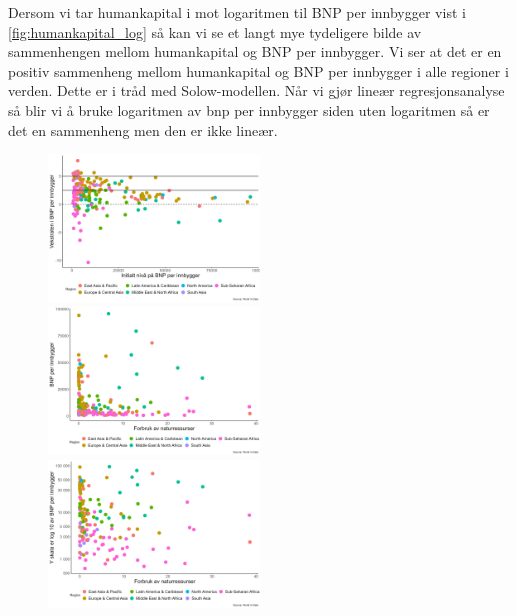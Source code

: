 \documentclass[
  12pt,
  a4paper,
  DIV=11,
  numbers=noendperiod]{scrartcl}
\begin{document}
Dersom vi tar humankapital i mot logaritmen til BNP per innbygger vist i
\autoref{fig:humankapital_log} så kan vi se et langt mye tydeligere
bilde av sammenhengen mellom humankapital og BNP per innbygger. Vi ser
at det er en positiv sammenheng mellom humankapital og BNP per innbygger
i alle regioner i verden. Dette er i tråd med Solow-modellen. Når vi
gjør lineær regresjonsanalyse så blir vi å bruke logaritmen av bnp per
innbygger siden uten logaritmen så er det en sammenheng men den er ikke
lineær.

\clearpage

\begin{figure}
  \centering
  \includegraphics[width=0.5\textwidth]{dokumentobjekter/figurer/vekstrate_bnp_per_innbygger.png}
  \label{fig:vekstrate}
  \includegraphics[width=0.5\textwidth]{dokumentobjekter/figurer/naturressurser_bnp_per_innbygger.png}
  \label{fig:naturressurser}
  \includegraphics[width=0.5\textwidth]{dokumentobjekter/figurer/naturressurser_bnp_per_innbygger_log.png}
  \label{fig:naturressurser_log}
\end{figure}
\end{document}
